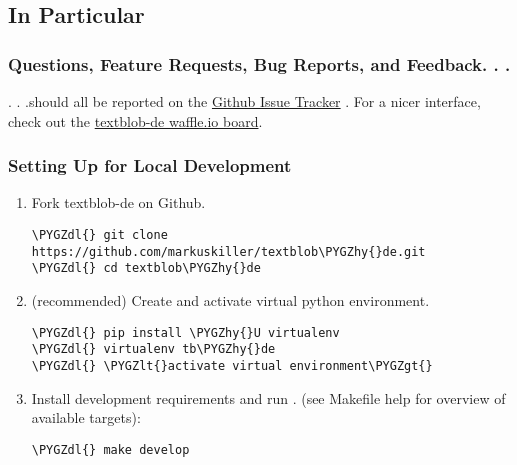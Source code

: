 \documentclass[letterpaper,10pt,english]{sphinxmanual}
\def\PYGZlt{\char`\<}
\def\PYGZgt{\char`\>}
\def\PYGZdl{\char`\$}
\def\PYGZhy{\char`\-}
\begin{document}
\subsection{In Particular}
\label{contributing:pep-8}\label{contributing:in-particular}

\subsubsection{Questions, Feature Requests, Bug Reports, and Feedback. . .}
\label{contributing:questions-feature-requests-bug-reports-and-feedback}
. . .should all be reported on the \href{https://github.com/markuskiller/textblob-de/issues?state=open}{Github Issue Tracker} . For a nicer interface, check out the \href{https://waffle.io/markuskiller/textblob-de}{textblob-de waffle.io board}.


\subsubsection{Setting Up for Local Development}
\label{contributing:setting-up-for-local-development}\label{contributing:github-issue-tracker}\begin{enumerate}
\item {} 
Fork textblob-de on Github.

\begin{Verbatim}[commandchars=\\\{\}]
\PYGZdl{} git clone https://github.com/markuskiller/textblob\PYGZhy{}de.git
\PYGZdl{} cd textblob\PYGZhy{}de
\end{Verbatim}

\item {} 
(recommended) Create and activate virtual python environment.

\begin{Verbatim}[commandchars=\\\{\}]
\PYGZdl{} pip install \PYGZhy{}U virtualenv
\PYGZdl{} virtualenv tb\PYGZhy{}de
\PYGZdl{} \PYGZlt{}activate virtual environment\PYGZgt{}
\end{Verbatim}

\item {} 
Install development requirements and run .
(see Makefile help for overview of available
 targets):

\begin{Verbatim}[commandchars=\\\{\}]
\PYGZdl{} make develop
\end{Verbatim}

\end{enumerate}
\end{document}
